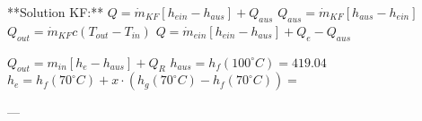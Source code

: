 **Solution KF:**  
\( Q = \dot{m}_{KF} [h_{ein} - h_{aus}] + Q_{aus} \)  
\( Q_{aus} = \dot{m}_{KF} [h_{aus} - h_{ein}] \)  
\( Q_{out} = \dot{m}_{KF} c (T_{out} - T_{in}) \)  
\( Q = \dot{m}_{ein} [h_{ein} - h_{aus}] + Q_{e} - Q_{aus} \)  

\( Q_{out} = m_{in} [h_{e} - h_{aus}] + Q_{R} \)  
\( h_{aus} = h_{f} (100^\circ C) = 419.04 \)  
\( h_{e} = h_{f} (70^\circ C) + x \cdot (h_{g} (70^\circ C) - h_{f} (70^\circ C)) = \)  

---